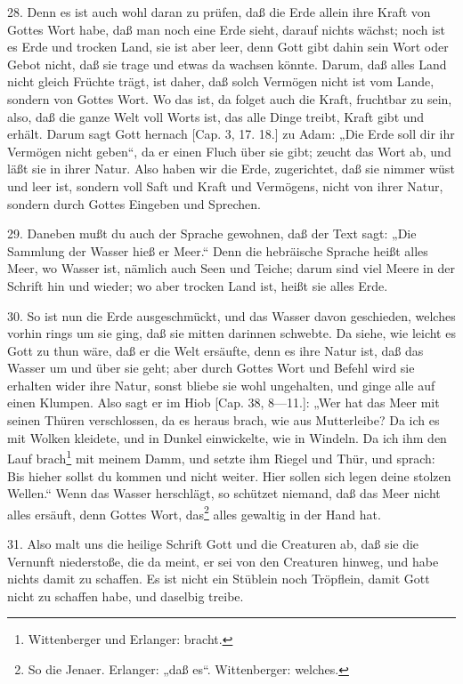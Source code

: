 28. Denn es ist auch wohl daran zu prüfen, daß die Erde allein ihre Kraft von Gottes Wort habe, daß man noch eine Erde sieht, darauf nichts wächst; noch ist es Erde und trocken Land, sie ist aber leer, denn Gott gibt dahin sein Wort oder Gebot nicht, daß sie trage und etwas da wachsen könnte. Darum, daß alles Land nicht gleich Früchte trägt, ist daher, daß solch Vermögen nicht ist vom Lande, sondern von Gottes Wort. Wo das ist, da folget auch die Kraft, fruchtbar zu sein, also, daß die ganze Welt voll Worts ist, das alle Dinge treibt, Kraft gibt und erhält. Darum sagt Gott hernach [Cap. 3, 17. 18.] zu Adam: „Die Erde soll dir ihr Vermögen nicht geben“, da er einen Fluch über sie gibt; zeucht das Wort ab, und läßt sie in ihrer Natur. Also haben wir die Erde, zugerichtet, daß sie nimmer wüst und leer ist, sondern voll Saft und Kraft und Vermögens, nicht von ihrer Natur, sondern durch Gottes Eingeben und Sprechen.

29. Daneben mußt du auch der Sprache gewohnen, daß der Text sagt: „Die Sammlung der Wasser hieß er Meer.“ Denn die hebräische Sprache heißt alles Meer, wo Wasser ist, nämlich auch Seen und Teiche; darum sind viel Meere in der Schrift hin und wieder; wo aber trocken Land ist, heißt sie alles Erde.

30. So ist nun die Erde ausgeschmückt, und das Wasser davon geschieden, welches vorhin rings um sie ging, daß sie mitten darinnen schwebte. Da siehe, wie leicht es Gott zu thun wäre, daß er die Welt ersäufte, denn es ihre Natur ist, daß das Wasser um und über sie geht; aber durch Gottes Wort und Befehl wird sie erhalten wider ihre Natur, sonst bliebe sie wohl ungehalten, und ginge alle auf einen Klumpen. Also sagt er im Hiob [Cap. 38, 8—11.]: „Wer hat das Meer mit seinen Thüren verschlossen, da es heraus brach, wie aus Mutterleibe? Da ich es mit Wolken kleidete, und in Dunkel einwickelte, wie in Windeln. Da ich ihm den Lauf brach\footnote{Wittenberger und Erlanger: bracht.} mit meinem Damm, und setzte ihm Riegel und Thür, und sprach: Bis hieher sollst du kommen und nicht weiter. Hier sollen sich legen deine stolzen Wellen.“ Wenn das Wasser herschlägt, so schützet niemand, daß das Meer nicht alles ersäuft, denn Gottes Wort, das\footnote{So die Jenaer. Erlanger: „daß es“. Wittenberger: welches.} alles gewaltig in der Hand hat.

31. Also malt uns die heilige Schrift Gott und die Creaturen ab, daß sie die Vernunft niederstoße, die da meint, er sei von den Creaturen hinweg, und habe nichts damit zu schaffen. Es ist nicht ein Stüblein noch Tröpflein, damit Gott nicht zu schaffen habe, und daselbig treibe.

